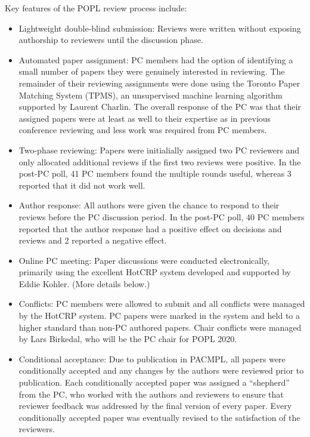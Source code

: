 Key features of the POPL review process include:
\begin{itemize}
\item Lightweight double-blind submission: Reviews were written without
  exposing authorship to reviewers until the discussion phase.
\item Automated paper assignment: PC members had the option of identifying a
  small number of papers they were genuinely interested in reviewing. The
  remainder of their reviewing assignments were done using the Toronto Paper
  Matching System (TPMS), an unsupervised machine learning algorithm supported
  by Laurent Charlin. The overall response of the PC was that their assigned
  papers were at least as well to their expertise as in previous conference
  reviewing and less work was required from PC members.
\item Two-phase reviewing: Papers were initialially assigned two PC reviewers
  and only allocated additional reviews if the first two reviews were
  positive. In the post-PC poll, 41 PC members found the multiple rounds
  useful, whereas 3 reported that it did not work well.
\item Author response: All authors were given the chance to respond to their
  reviews before the PC discussion period. In the post-PC poll, 40 PC members
  reported that the author response had a positive effect on decisions and
  reviews and 2 reported a negative effect.
\item Online PC meeting: Paper discussions were conducted electronically,
  primarily using the excellent HotCRP system developed and supported by Eddie
  Kohler. (More details below.)
\item Conflicts: PC members were allowed to submit and all conflicts were
  managed by the HotCRP system. PC papers were marked in the system and held
  to a higher standard than non-PC authored papers. Chair conflicts were
  managed by Lars Birkedal, who will be the PC chair for POPL 2020.
\item Conditional acceptance: Due to publication in PACMPL, all papers were
  conditionally accepted and any changes by the authors were reviewed prior to
  publication. Each conditionally accepted paper was assigned a ``shepherd''
  from the PC, who worked with the authors and reviewers to ensure that
  reviewer feedback was addressed by the final version of every paper. Every
  conditionally accepted paper was eventually revised to the satisfaction of
  the reviewers.
\end{itemize}

